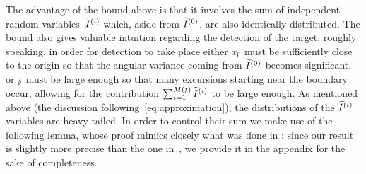 The advantage of the bound above is that it involves the sum of independent random variables~$\tI^{(i)}$ which, aside from $\tI^{(0)}$, are also identically distributed. The bound also gives valuable intuition regarding the detection of the target: roughly speaking, in order for detection to take place either $x_0$ must be sufficiently close to the origin so that the angular variance coming from $\tI^{(0)}$ becomes significant, or $\ss$ must be large enough so that many excursions starting near the boundary occur, allowing for the contribution $\sum_{i=1}^{M(\ss)}\tI^{(i)}$ to be large enough. As mentioned above (the discussion following~\eqref{eq:approximation}), the distributions of the $\tI^{(i)}$ variables are heavy-tailed. In order to control their sum we make use of the following lemma, whose proof mimics closely what was done in \cite{Omelchenko2019}: since our result is slightly more precise than the one in~\cite{Omelchenko2019}, we provide it in the appendix for the sake of completeness. 

